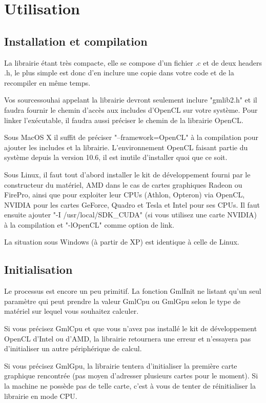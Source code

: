 \documentclass[a4paper,12pt]{article}
\begin{document}
%
%

\section{Utilisation}
\label{util}
\subsection{Installation et compilation}
La librairie étant très compacte, elle se compose d'un fichier .c et de deux headers .h, le plus simple est donc d'en inclure une copie dans votre code et de la recompiler en même temps.

Vos sourcessouhai appelant la librairie devront seulement inclure "gmlib2.h" et il faudra fournir le chemin d'accès aux includes d'OpenCL sur votre système. Pour linker l'exécutable, il faudra aussi préciser le chemin de la librairie OpenCL.

Sous MacOS X il suffit de préciser "--framework=OpenCL" à la compilation pour ajouter les includes et la librairie. L'environnement OpenCL faisant partie du système depuis la version 10.6, il est inutile d'installer quoi que ce soit.

Sous Linux, il faut tout d'abord installer le kit de développement fourni par le constructeur du matériel, AMD dans le cas de cartes graphiques Radeon ou FirePro, ainsi que pour exploiter leur CPUs (Athlon, Opteron) via OpenCL, NVIDIA pour les cartes GeForce, Quadro et Tesla et Intel pour ses CPUs.
Il faut ensuite ajouter "-I /usr/local/SDK\_CUDA" (si vous utilisez une carte NVIDIA) à la compilation et "-lOpenCL" comme option de link.

La situation sous Windows (à partir de XP) est identique à celle de Linux.


\subsection{Initialisation}
Le processus est encore un peu primitif. La fonction GmlInit ne listant qu'un seul paramètre qui peut prendre la valeur GmlCpu ou GmlGpu selon le type de matériel sur lequel vous souhaitez calculer.

Si vous précisez GmlCpu et que vous n'avez pas installé le kit de développement OpenCL d'Intel ou d'AMD, la librairie retournera une erreur et n'essayera pas d'initialiser un autre périphérique de calcul.

Si  vous précisez GmlGpu, la librairie tentera d'initialiser la première carte graphique rencontrée (pas moyen d'adresser plusieurs cartes pour le moment). Si la machine ne possède pas de telle carte, c'est à vous de tenter de réinitialiser la librairie en mode CPU.
\end{document}
